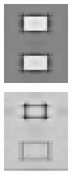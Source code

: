 \documentclass[journal,onecolumn]{IEEEtran}
\begin{document}
{\begin{figure}[H]
\begin{subfigure}[b]{0.2\textwidth}
            \caption{}
            \label{fig:test-crisp-dwt-3-rg}
    \end{subfigure}\\
    \begin{subfigure}[b]{0.2\textwidth}
            \centering
            \includegraphics[width=.85\linewidth, frame]{test-crisp-dwt-1-by}
            \caption{}
            \label{fig:test-crisp-dwt-1-by}
    \end{subfigure}%
    \begin{subfigure}[b]{0.2\textwidth}
            \centering
            \includegraphics[width=.85\linewidth, frame]{test-crisp-dwt-2-by}

\end{subfigure}
\end{figure}}
\end{document}
